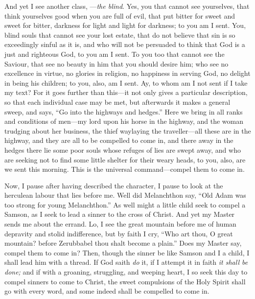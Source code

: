 \documentclass[
]{book}
\begin{document}
And yet I see another class, ---\emph{the blind}. Yes, you that cannot see yourselves, that think yourselves good when you are full of evil, that put bitter for sweet and sweet for bitter, darkness for light and light for darkness; to you am I sent. You, blind souls that cannot see your lost estate, that do not believe that sin is so exceedingly sinful as it is, and who will not be persuaded to think that God is a just and righteous God, to you am I sent. To you too that cannot see the Saviour, that see no beauty in him that you should desire him; who see no excellence in virtue, no glories in religion, no happiness in serving God, no delight in being his children; to you, also, am I sent. Ay, to whom am I not sent if I take my text? For it goes further than this---it not only gives a particular description, so that each individual case may be met, but afterwards it makes a general sweep, and says, ``Go into the highways and hedges.'' Here we bring in all ranks and conditions of men---my lord upon his horse in the highway, and the woman trudging about her business, the thief waylaying the traveller---all these are in the highway, and they are all to be compelled to come in, and there away in the hedges there lie some poor souls whose refuges of lies are swept away, and who are seeking not to find some little shelter for their weary heads, to you, also, are we sent this morning. This is the universal command---compel them to come in.

Now, I pause after having described the character, I pause to look at the herculean labour that lies before me. Well did Melanchthon say, ``Old Adam was too strong for young Melanchthon.'' As well might a little child seek to compel a Samson, as I seek to lead a sinner to the cross of Christ. And yet my Master sends me about the errand. Lo, I see the great mountain before me of human depravity and stolid indifference, but by faith I cry, ``Who art thou, O great mountain? before Zerubbabel thou shalt become a plain.'' Does my Master say, compel them to come in? Then, though the sinner be like Samson and I a child, I shall lead him with a thread. If God saith \emph{do} it, if I attempt it in faith \emph{it shall be done;} and if with a groaning, struggling, and weeping heart, I so seek this day to compel sinners to come to Christ, the sweet compulsions of the Holy Spirit shall go with every word, and some indeed shall be compelled to come in.
\end{document}
